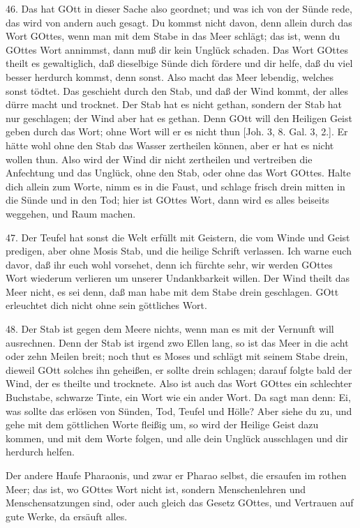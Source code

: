 46. Das hat GOtt in dieser Sache also geordnet; und was ich von der Sünde rede, das
wird von andern auch gesagt. Du kommst nicht davon, denn allein durch das Wort GOttes, wenn man mit dem Stabe in das Meer schlägt; das ist, wenn du GOttes Wort annimmst, dann muß dir kein Unglück schaden. Das Wort GOttes theilt es gewaltiglich, daß dieselbige Sünde dich fördere und dir helfe, daß du viel besser herdurch kommst, denn sonst. Also macht das Meer lebendig, welches sonst tödtet. Das geschieht durch den Stab, und daß der Wind kommt, der alles dürre macht und trocknet. Der Stab hat es nicht gethan, sondern der Stab hat nur geschlagen; der Wind aber hat es gethan. Denn GOtt will den Heiligen Geist geben durch das Wort; ohne Wort will er es nicht thun [Joh. 3, 8. Gal. 3, 2.]. Er hätte wohl ohne den Stab das Wasser zertheilen können, aber er hat es nicht wollen thun. Also wird der Wind dir nicht zertheilen und vertreiben die Anfechtung und das Unglück, ohne den Stab, oder ohne das Wort GOttes. Halte dich allein zum Worte, nimm es in die Faust, und schlage frisch drein mitten in die Sünde und in den Tod; hier ist GOttes Wort, dann wird es alles beiseits weggehen, und Raum machen.

47. Der Teufel hat sonst die Welt erfüllt mit Geistern, die vom Winde und Geist predigen, aber ohne Mosis Stab, und die heilige Schrift verlassen. Ich warne euch davor, daß ihr euch wohl vorsehet, denn ich fürchte sehr, wir werden GOttes Wort wiederum verlieren um unserer Undankbarkeit willen. Der Wind theilt das Meer nicht, es sei denn, daß man habe mit dem Stabe drein geschlagen. GOtt erleuchtet dich nicht ohne sein göttliches Wort.

48. Der Stab ist gegen dem Meere nichts, wenn man es mit der Vernunft will ausrechnen. Denn der Stab ist irgend zwo Ellen lang, so ist das Meer in die acht oder zehn Meilen breit; noch thut es Moses und schlägt mit seinem Stabe drein, dieweil GOtt solches ihn geheißen, er sollte drein schlagen; darauf folgte bald der Wind, der es theilte und trocknete. Also ist auch das Wort GOttes ein schlechter Buchstabe, schwarze Tinte, ein Wort wie ein ander Wort. Da sagt man denn: Ei, was sollte das erlösen von Sünden, Tod, Teufel und Hölle? Aber siehe du zu, und gehe mit dem göttlichen Worte fleißig um, so wird der Heilige Geist dazu kommen, und mit dem Worte folgen, und alle dein Unglück ausschlagen und dir herdurch helfen.

Der andere Haufe Pharaonis, und zwar er Pharao selbst, die ersaufen im rothen Meer; das ist, wo GOttes Wort nicht ist, sondern Menschenlehren und Menschensatzungen sind, oder auch gleich das Gesetz GOttes, und Vertrauen auf gute Werke, da ersäuft alles.

